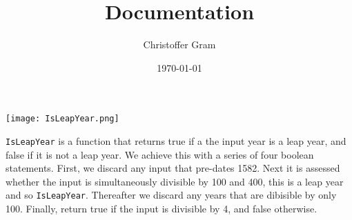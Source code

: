 \documentclass{article}
\title{Documentation}
\author{Christoffer Gram}
\date{\today}
\begin{document}
    \maketitle

    \texttt{[image: IsLeapYear.png]}

    \texttt{IsLeapYear} is a function that returns true if a the input year is a leap year, and false if it is not a
    leap year. We achieve this with a series of four boolean statements. First, we discard any input that pre-dates
    1582. Next it is assessed whether the input is simultaneously divisible by 100 and 400, this is a leap year and so
    \texttt{IsLeapYear}. Thereafter we discard any years that are dibisible by only 100. Finally, return true if the input
    is divisible by 4, and false otherwise.  
\end{document}
